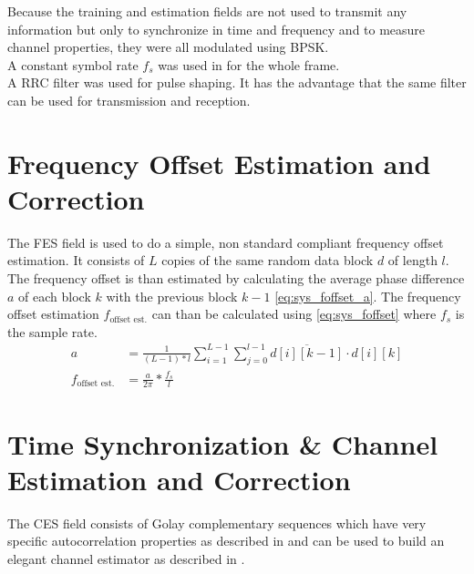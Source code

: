 Because the training and estimation fields are not used to
transmit any information but only to synchronize in time
and frequency and to measure channel properties, they were all
modulated using \gls{BPSK}. \\

A constant symbol rate $f_s$ was used in for the whole frame. \\

A \gls{RRC} filter was used for pulse shaping. It has the advantage that
the same filter can be used for transmission and reception. \\

\section{Frequency Offset Estimation and Correction}
\label{sec:sys_fes}
The \gls{FES} field is used to do a simple, non standard compliant frequency
offset estimation. It consists of $L$ copies of the same random data block $d$
of length $l$.
The frequency offset is than estimated by calculating the average phase
difference $a$ of each block $k$ with the previous block $k - 1$
\eqref{eq:sys_foffset_a}. The frequency offset estimation
$f_{\text{offset est.}}$ can than be calculated using \eqref{eq:sys_foffset}
where $f_s$ is the sample rate. \\

\begin{subequations}
  \begin{alignat}{2}
    a &= \frac{1}{(L-1) * l}
    \sum_{i=1}^{L-1} \sum_{j=0}^{l-1} \overline{d[i][k-1]} \cdot d[i][k]
    \label{eq:sys_foffset_a} \\
    f_{\text{offset est.}} &= \frac{a}{2 \pi} * \frac{f_s}{l}
    \label{eq:sys_foffset}
  \end{alignat}
\end{subequations}

\section{Time Synchronization \& Channel Estimation and Correction}
\label{sec:sys_ces}

The \gls{CES} field consists of Golay complementary sequences which
have very specific autocorrelation properties as described in
 and can be used to build an elegant
channel estimator as described in . \\

